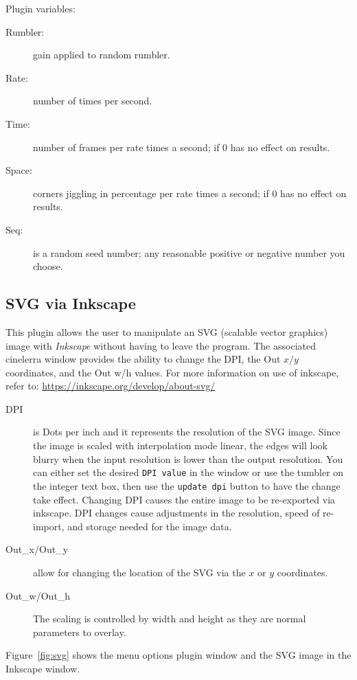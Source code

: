 Plugin variables:

\begin{description}
    \item[Rumbler:] gain applied to random rumbler.
    \item[Rate:] number of times per second.
    \item[Time:] number of frames per rate times a second; if 0 has no effect on results.
    \item[Space:] corners jiggling in percentage per rate times a second; if 0 has no effect on results.
    \item[Seq:] is a random seed number; any reasonable positive or negative number you choose.
\end{description}

\subsection{SVG via Inkscape}%
\label{sub:svg_via_inkscape}

This plugin allows the user to manipulate an SVG (scalable vector graphics) image with \textit{Inkscape} without having to leave the program. The associated cinelerra window provides the ability to change the DPI, the Out $x/y$ coordinates, and the Out w/h values. For more information on use of inkscape, refer to: \url{https://inkscape.org/develop/about-svg/}

\begin{description}
    \item[DPI] is Dots per inch and it represents the resolution of the SVG image. Since the image is scaled with interpolation mode linear, the edges will look blurry when the input resolution is lower than the output resolution. You can either set the desired \texttt{DPI value} in the window or use the tumbler on the integer text box, then use the \texttt{update dpi} button to have the change take effect. Changing DPI causes the entire image to be re-exported via inkscape. DPI changes cause adjustments in the resolution, speed of re-import, and storage needed for the image data.
    \item[Out\_x/Out\_y] allow for changing the location of the SVG via the $x$ or $y$ coordinates.
    \item[Out\_w/Out\_h]  The scaling is controlled by width and height as they are normal parameters to overlay.
\end{description}

Figure~\ref{fig:svg} shows the menu options plugin window and the SVG image in the Inkscape window.

